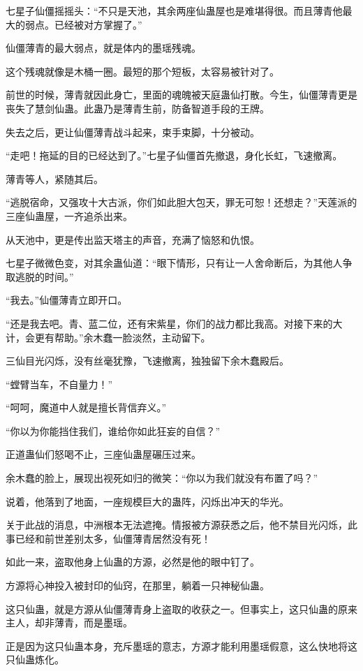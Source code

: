 \begin{this_body}
七星子仙僵摇摇头：“不只是天池，其余两座仙蛊屋也是难堪得很。而且薄青他最大的弱点。已经被对方掌握了。”

仙僵薄青的最大弱点，就是体内的墨瑶残魂。

这个残魂就像是木桶一圈。最短的那个短板，太容易被针对了。

前世的时候，薄青就因此身亡，里面的魂魄被天庭蛊仙打散。今生，仙僵薄青更是丧失了慧剑仙蛊。此蛊乃是薄青生前，防备智道手段的王牌。

失去之后，更让仙僵薄青战斗起来，束手束脚，十分被动。

“走吧！拖延的目的已经达到了。”七星子仙僵首先撤退，身化长虹，飞速撤离。

薄青等人，紧随其后。

“逃脱宿命，又强攻十大古派，你们如此胆大包天，罪无可恕！还想走？”天莲派的三座仙蛊屋，一齐追杀出来。

从天池中，更是传出监天塔主的声音，充满了恼怒和仇恨。

七星子微微色变，对其余蛊仙道：“眼下情形，只有让一人舍命断后，为其他人争取逃脱的时间。”

“我去。”仙僵薄青立即开口。

“还是我去吧。青、蓝二位，还有宋紫星，你们的战力都比我高。对接下来的大计，会更有帮助。”余木蠢一脸淡然，主动留下。

三仙目光闪烁，没有丝毫犹豫，飞速撤离，独独留下余木蠢殿后。

“螳臂当车，不自量力！”

“呵呵，魔道中人就是擅长背信弃义。”

“你以为你能挡住我们，谁给你如此狂妄的自信？”

正道蛊仙们怒喝不止，三座仙蛊屋碾压过来。

余木蠢的脸上，展现出视死如归的微笑：“你以为我们就没有布置了吗？”

说着，他落到了地面，一座规模巨大的蛊阵，闪烁出冲天的华光。

关于此战的消息，中洲根本无法遮掩。情报被方源获悉之后，他不禁目光闪烁，此事已经和前世差别太多，仙僵薄青居然没有死！

如此一来，盗取他身上仙蛊的方源，必然是他的眼中钉了。

方源将心神投入被封印的仙窍，在那里，躺着一只神秘仙蛊。

这只仙蛊，就是方源从仙僵薄青身上盗取的收获之一。但事实上，这只仙蛊的原来主人，却非薄青，而是墨瑶。

正是因为这只仙蛊本身，充斥墨瑶的意志，方源才能利用墨瑶假意，这么快地将这只仙蛊炼化。


\end{this_body}
